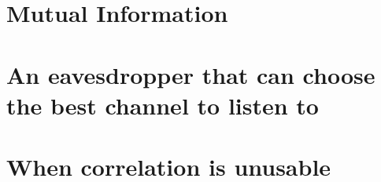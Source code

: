 \section{Mutual Information}
\section{An eavesdropper that can choose the best channel to listen to}
\section{When correlation is unusable}
